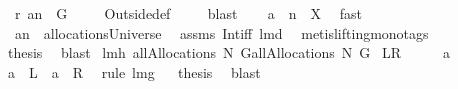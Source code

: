 \begin{isabellebody}
\ {\isachardoublequoteopen}{\isasymUnion}\ {\isacharquery}r\ {\isacharparenleft}a{\isacharminus}{\isacharminus}n{\isacharparenright}\ {\isasymsubseteq}\ G{\isachardoublequoteclose}\ \isanewline
\ \ \isamarkupfalse%
\ Outside{\isacharunderscore}def\ \isamarkupfalse%
\ {}\ \isamarkupfalse%
\ blast\ \isamarkupfalse%
\ \isamarkupfalse%
\ {\isachardoublequoteopen}a\ {\isacharminus}{\isacharminus}\ n\ {\isasymin}\ {\isacharquery}X{}{\isachardoublequoteclose}\ \isamarkupfalse%
\ fast\ \isamarkupfalse%
\ \isamarkupfalse%
\ \isanewline
\ \ {\isachardoublequoteopen}a{\isacharminus}{\isacharminus}n\ {\isasymin}\ allocationsUniverse{\isachardoublequoteclose}\ \isamarkupfalse%
\ assms{\isacharparenleft}{}{\isacharparenright}\ Int{\isacharunderscore}iff\ lm{}{}d\ \isamarkupfalse%
\ {\isacharparenleft}metis{\isacharparenleft}lifting{\isacharcomma}mono{\isacharunderscore}tags{\isacharparenright}{\isacharparenright}\ \isanewline
\ \ \isamarkupfalse%
\ \isamarkupfalse%
\ {\isacharquery}thesis\ \isamarkupfalse%
\ blast\isanewline
{}\isamarkupfalse%
%
\endisatagproof
{\isafoldproof}%
%
\isadelimproof
\isanewline
%
\endisadelimproof
\isanewline
{}\isamarkupfalse%
\ lm{}{}h{\isacharcolon}\ {\isachardoublequoteopen}allAllocations{\isacharprime}{\isacharprime}{\isacharprime}\ N\ G{\isacharequal}allAllocations{\isacharprime}{\isacharprime}{\isacharprime}{\isacharprime}\ N\ G{\isachardoublequoteclose}\isanewline
{\isacharparenleft}\ {\isachardoublequoteopen}{\isacharquery}L{\isacharequal}{\isacharquery}R{\isachardoublequoteclose}{\isacharparenright}%
\isadelimproof
\ %
\endisadelimproof
%
\isatagproof
{}\isamarkupfalse%
\ {\isacharminus}\ \isacommand{{\isacharbraceleft}}\isamarkupfalse%
\isamarkupfalse%
\ a\ \isamarkupfalse%
\ {\isachardoublequoteopen}a\ {\isasymin}\ {\isacharquery}L\ {\isacharequal}\ {\isacharparenleft}a\ {\isasymin}\ {\isacharquery}R{\isacharparenright}{\isachardoublequoteclose}\ \isamarkupfalse%
\ {\isacharparenleft}rule\ lm{}{}g{\isacharparenright}\isacommand{{\isacharbraceright}}\isamarkupfalse%
\ \isamarkupfalse%
\ {\isacharquery}thesis\ \isamarkupfalse%
\ blast\ \isamarkupfalse%

\end{isabellebody}

